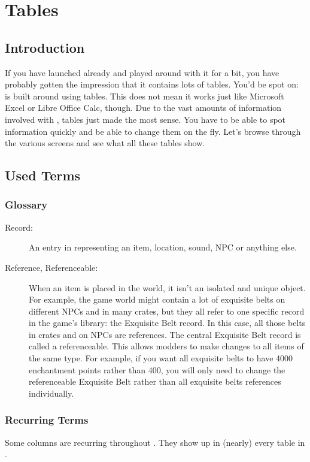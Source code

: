\section{Tables}

\subsection{Introduction}
If you have launched \OCS{} already and played around with it for a bit, you have probably gotten the impression that it contains lots of tables.
You'd be spot on: \OCS{} is built around using tables. This does not mean it works just like Microsoft Excel or Libre Office Calc, though. 
Due to the vast amounts of information involved with \MW, tables just made the most sense. You have to be able to spot information quickly
and be able to change them on the fly.
Let's browse through the various screens and see what all these tables show.

\subsection{Used Terms}

\subsubsection{Glossary}

\begin{description}
 \item[Record:] An entry in \OCS{} representing an item, location, sound, NPC or anything else.

 \item[Reference, Referenceable:] When an item is placed in the world, it isn't an isolated and unique object. For example, the game world might contain a lot of exquisite belts on different NPCs and in many crates, but they all refer to one specific record in the game's library: the Exquisite Belt record. In this case, all those belts in crates and on NPCs are references. The central Exquisite Belt record is called a referenceable. This allows modders to make changes to all items of the same type. For example, if you want all exquisite belts to have 4000 enchantment points rather than 400, you will only need to change the referenceable Exquisite Belt rather than all exquisite belts references individually.
\end{description}

\subsubsection{Recurring Terms}
Some columns are recurring throughout \OCS. They show up in (nearly) every table in \OCS.

